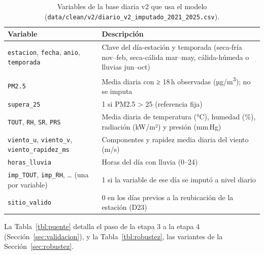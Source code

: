 \begin{table}[H]
\centering\small
\caption{Variables de la base diaria v2 que usa el modelo (\texttt{data/clean/v2/diario\_v2\_imputado\_2021\_2025.csv}).}
\label{tbl:b-diccionario}
\begin{tabularx}{\textwidth}{>{\raggedright\arraybackslash}p{5.4cm}L}
\toprule
Variable & Descripción\\
\midrule
\texttt{estacion}, \texttt{fecha}, \texttt{anio}, \texttt{temporada} & Clave del día-estación y temporada (seca-fría nov–feb, seca-cálida mar–may, cálida-húmeda o lluvias jun–oct)\\
\texttt{PM2.5} & Media diaria con ≥ 18\,h observadas (µg/m\textsuperscript{3}); no se imputa\\
\texttt{supera\_25} & 1 si PM2.5 > 25\ugm{} (referencia fija)\\
\texttt{TOUT}, \texttt{RH}, \texttt{SR}, \texttt{PRS} & Media diaria de temperatura (°C), humedad (\%), radiación (kW/m²) y presión (mm\,Hg)\\
\texttt{viento\_u}, \texttt{viento\_v}, \texttt{viento\_rapidez\_ms} & Componentes y rapidez media diaria del viento (m/s)\\
\texttt{horas\_lluvia} & Horas del día con lluvia (0–24)\\
\texttt{imp\_TOUT}, \texttt{imp\_RH}, … (una por variable) & 1 si la variable de ese día se imputó a nivel diario\\
\texttt{sitio\_valido} & 0 en los días previos a la reubicación de la estación (D23)\\
\bottomrule
\end{tabularx}
\end{table}

La Tabla~\ref{tbl:puente} detalla el paso de la etapa 3 a la etapa 4 (Sección~\ref{sec:validacion}), y la Tabla~\ref{tbl:robustez}, las variantes de la Sección~\ref{sec:robustez}.

